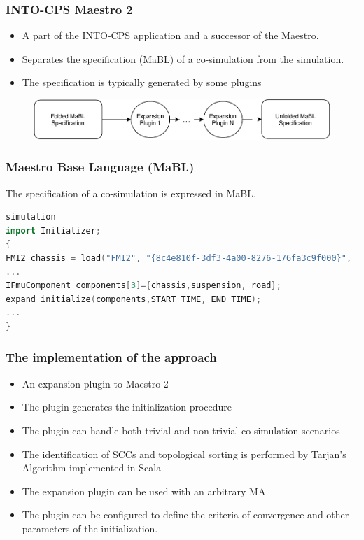\documentclass{beamer}
\begin{document}
\begin{frame}
\frametitle{INTO-CPS Maestro 2}
\begin{itemize}
    \item A part of the INTO-CPS application and a successor of the Maestro.    
    \item Separates the specification (MaBL) of a co-simulation from the simulation.
    \item The specification is typically generated by some plugins
\end{itemize}
\begin{figure}
    \centering
    \includegraphics[scale=0.6]{images/ExpansionPlugin-Page-1.pdf}
    \label{fig:my_label}
\end{figure}
\end{frame}


\begin{frame}[fragile]
\frametitle{Maestro Base Language (MaBL)}
The specification of a co-simulation is expressed in MaBL.

\begin{lstlisting}[language=C++]
simulation
import Initializer;
{
FMI2 chassis = load("FMI2", "{8c4e810f-3df3-4a00-8276-176fa3c9f000}", "src/chassis-c.fmu");
...
IFmuComponent components[3]={chassis,suspension, road};
expand initialize(components,START_TIME, END_TIME);
...
}
\end{lstlisting}
\end{frame}


\begin{frame}
\frametitle{The implementation of the approach}
\begin{itemize}
    \item An expansion plugin to Maestro 2
    \item The plugin generates the initialization procedure
    \item The plugin can handle both trivial and non-trivial co-simulation scenarios
    \item The identification of SCCs and topological sorting is performed by Tarjan's Algorithm implemented in Scala
    \item The expansion plugin can be used with an arbitrary MA
    \item The plugin can be configured to define the criteria of convergence and other parameters of the initialization.
\end{itemize}
\end{frame}
\end{document}

